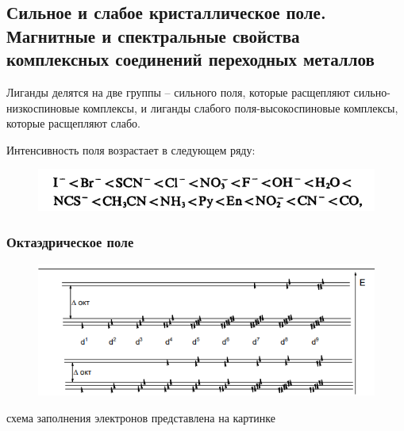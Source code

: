 \subsection{Сильное и слабое кристаллическое поле. Магнитные и спектральные свойства комплексных соединений переходных металлов}

 Лиганды делятся на две группы – сильного поля, которые расщепляют сильно-низкоспиновые комплексы, и лиганды слабого поля-высокоспиновые комплексы, которые расщепляют слабо. 
 
Интенсивность поля возрастает в следующем ряду:
 
\begin{figure}[H]
\centering
\includegraphics[scale=.600]{images/spectrochem_row.png}
\end{figure}
 
 \subsubsection{Октаэдрическое поле}
 
 \begin{figure}[htp]
\centering
\includegraphics[scale=1.00]{images/electrones.png}
\end{figure} схема заполнения электронов представлена на картинке

